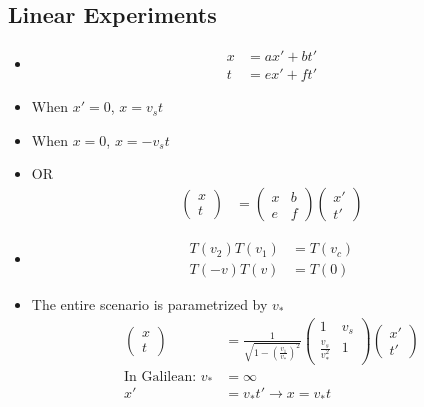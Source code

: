 \documentclass[12pt,letterpaper, twocolumn]{article}
\begin{document}
\subsection{Linear Experiments}
\begin{itemize}
    \item \begin{align*}
        x&= ax' + bt'\\
        t&= ex'+ft'
    \end{align*}
    \item When $x'=0$, $x={v_s}t$
    \item When $x=0$, $x=-{v_s}t$
    \item OR \begin{align*}
        \begin{pmatrix}x\\t\end{pmatrix} &= \begin{pmatrix}x&b\\e&f\end{pmatrix}\begin{pmatrix}x'\\t'\end{pmatrix}
    \end{align*}
    \item \begin{align*}
        T(v_2)T(v_1) &= T(v_c)\\
        T(-v)T(v) &= T(0)
    \end{align*}
    \item The entire scenario is parametrized by $v_*$ \begin{align*}
        \begin{pmatrix}x\\t\end{pmatrix} &= \frac{1}{\sqrt{1-(\frac{v_1}{v_*})^2}}\begin{pmatrix}1&v_s\\\frac{v_s}{v_*^2} & 1\end{pmatrix}\begin{pmatrix}x'\\t'\end{pmatrix}\\
        \text{In Galilean: }v_* &= \infty\\
        x' &= v_{*}t' \rightarrow x = v_{*}t
    \end{align*}
\end{itemize}
\end{document}
